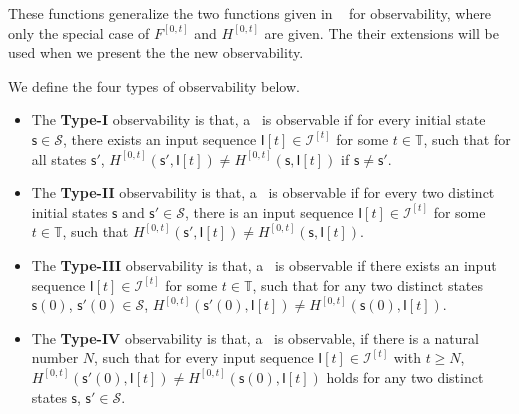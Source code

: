 These functions generalize the two functions given in ~\cite{Zhang2016Observability} for observability,  where only the special case of $F^{[0,t]}$ and $H^{[0,t]}$ are given. The their extensions  will be used when we present the the new observability.
\begin{definition} 
We define the four types of observability below. 
\begin{itemize}
  \item The {\bf Type-I} observability is that, a \BCN\ is observable if for every initial state $\mathsf{s}\in \mathcal{S}$, there exists an input sequence $\mathsf{I}[t]\in\mathcal{I}^{[t]}$ for some $t\in\mathbb{T}$, such that for all states $\mathsf{s}'$, $H^{[0,t]}(\mathsf{s}',\mathsf{I}[t])\neq H^{[0,t]}(\mathsf{s}, \mathsf{I}[t])$ if $\mathsf{s}\ne\mathsf{s}'$.
  \item The  {\bf Type-II} observability is that, a \BCN\ is observable if for every two distinct initial states $\mathsf{s}$ and $\mathsf{s}' \in \mathcal{S}$, there is an input sequence $\mathsf{I}[t]\in\mathcal{I}^{[t]}$ for some $t\in\mathbb{T}$, such that $H^{[0,t]}(\mathsf{s}',\mathsf{I}[t])\neq H^{[0,t]}(\mathsf{s}, \mathsf{I}[t])$.
  \item The {\bf Type-III} observability is that, a \BCN\ is observable if there exists an input sequence $\mathsf{I}[t]\in\mathcal{I}^{[t]}$ for some $t\in\mathbb{T}$, such that for any two distinct states $\mathsf{s}(0)$, $\mathsf{s}'(0) \in \mathcal{S}$, $H^{[0,t]}(\mathsf{s}'(0),\mathsf{I}[t])\neq H^{[0,t]}(\mathsf{s}(0), \mathsf{I}[t])$.
  \item The {\bf Type-IV} observability is that, a \BCN\ is observable, if there is a  natural number $N$, such that for every input sequence $\mathsf{I}[t]\in\mathcal{I}^{[t]}$ with $t\ge N$, $H^{[0,t]}(\mathsf{s}'(0),\mathsf{I}[t])\neq H^{[0,t]}(\mathsf{s}(0), \mathsf{I}[t])$ holds for any two distinct states $\mathsf{s}$, $\mathsf{s}' \in \mathcal{S}$.
\end{itemize} 
\end{definition}

